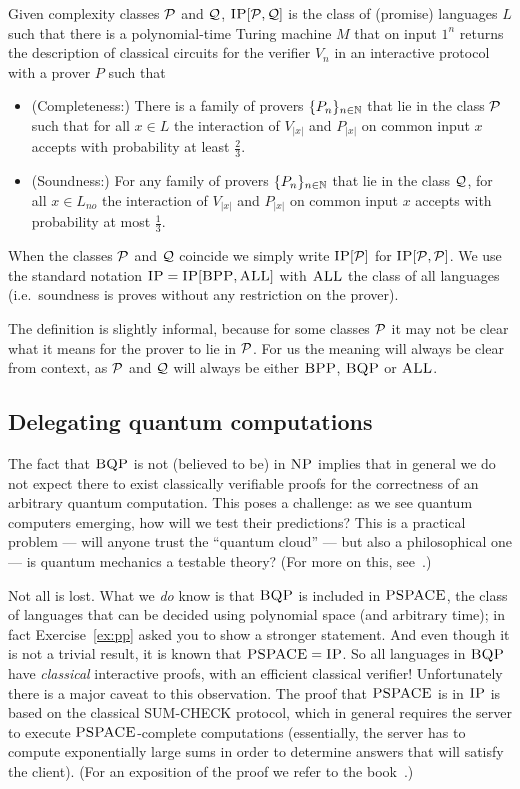 \begin{definition}
Given complexity classes $\mathcal{P}$ and $\mathcal{Q}$, $\textsc{IP}[\mathcal{P},\mathcal{Q}]$ is the class of (promise) languages $L$ such that there is a polynomial-time Turing machine $M$ that on input $1^n$ returns the description of classical circuits for the verifier $V_n$ in an interactive protocol with a prover $P$ such that 
\begin{itemize}
\item (Completeness:) There is a family of provers $\{P_n\}_{n\in \mathbb{N}}$ that lie in the class $\mathcal{P}$ such that for all $x\in L$ the interaction of $V_{|x|}$ and $P_{|x|}$ on common input $x$ accepts with probability at least $\frac{2}{3}$.
\item (Soundness:) For any family of provers $\{P_n\}_{n\in \mathbb{N}}$ that lie in the class $\mathcal{Q}$, for all $x\in L_{no}$ the interaction of $V_{|x|}$ and $P_{|x|}$ on common input $x$ accepts with probability at most $\frac{1}{3}$.
\end{itemize}
When the classes $\mathcal{P}$ and $\mathcal{Q}$ coincide we simply write $\textsc{IP}[\mathcal{P}]$ for $\textsc{IP}[\mathcal{P},\mathcal{P}]$. We use the standard notation $\textsc{IP} = \textsc{IP}[ \textsc{BPP}, \textsc{ALL}]$ with $\textsc{ALL}$ the class of all languages (i.e.\ soundness is proves without any restriction on the prover). 
\end{definition}

The definition is slightly informal, because for some classes $\mathcal{P}$ it may not be clear what it means for the prover to lie in $\mathcal{P}$. For us the meaning will always be clear from context, as $\mathcal{P}$ and $\mathcal{Q}$ will always be either $\textsc{BPP}$, $\textsc{BQP}$ or $\textsc{ALL}$. 


\subsection{Delegating quantum computations}

The fact that $\textsc{BQP}$ is not (believed to be) in $\textsc{NP}$ implies that in general we do not expect there to exist classically verifiable proofs for the correctness of an arbitrary quantum computation. This poses a challenge: as we see quantum computers emerging, how will we test their predictions? This is a practical problem --- will anyone trust the ``quantum cloud'' --- but also a philosophical one --- is quantum mechanics a testable theory? (For more on this, see~\cite{aharonov2013quantum}.)

Not all is lost. What we \emph{do} know is that $\textsc{BQP}$ is included in $\textsc{PSPACE}$, the class of languages that can be decided using polynomial space (and arbitrary time); in fact Exercise~\ref{ex:pp} asked you to show a stronger statement. And even though it is not a trivial result, it is known that $\textsc{PSPACE} = \textsc{IP}$. 
So all languages in $\textsc{BQP}$ have \emph{classical} interactive proofs, with an efficient classical verifier! Unfortunately there is a major caveat to this observation. The proof that $\textsc{PSPACE}$ is in $\textsc{IP}$ is based on the classical SUM-CHECK protocol, which in general requires the server to execute $\textsc{PSPACE}$-complete computations (essentially, the server has to compute exponentially large sums in order to determine answers that will satisfy the client). (For an exposition of the proof we refer to the book~\cite{arora2009computational}.)


